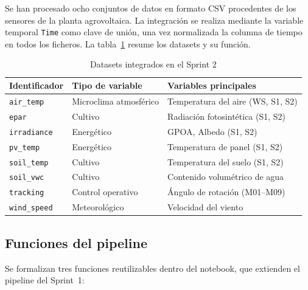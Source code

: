 \documentclass[12pt,a4paper]{article}
\begin{document}
Se han procesado ocho conjuntos de datos en formato CSV procedentes de los sensores de
la planta agrovoltaica. La integración se realiza mediante la variable temporal
\texttt{Time} como clave de unión, una vez normalizada la columna de tiempo en todos
los ficheros. La tabla~\ref{tab:datasets} resume los datasets y su función.

\begin{table}[H]
\centering
\caption{Datasets integrados en el Sprint 2}
\label{tab:datasets}
\begin{tabular}{lll}
\toprule
\textbf{Identificador} & \textbf{Tipo de variable} & \textbf{Variables principales} \\
\midrule
\texttt{air\_temp}   & Microclima atmosférico & Temperatura del aire (WS, S1, S2) \\
\texttt{epar}        & Cultivo                & Radiación fotosintética (S1, S2) \\
\texttt{irradiance}  & Energético             & GPOA, Albedo (S1, S2) \\
\texttt{pv\_temp}    & Energético             & Temperatura de panel (S1, S2) \\
\texttt{soil\_temp}  & Cultivo                & Temperatura del suelo (S1, S2) \\
\texttt{soil\_vwc}   & Cultivo                & Contenido volumétrico de agua \\
\texttt{tracking}    & Control operativo      & Ángulo de rotación (M01--M09) \\
\texttt{wind\_speed} & Meteorológico          & Velocidad del viento \\
\bottomrule
\end{tabular}
\end{table}

\subsection{Funciones del pipeline}

Se formalizan tres funciones reutilizables dentro del notebook, que extienden el pipeline
del Sprint~1:
\end{document}

